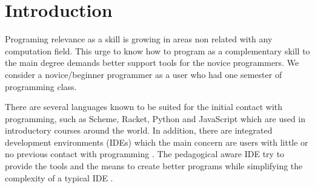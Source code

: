\section{Introduction}




Programing relevance as a skill is growing in areas non related with any computation field.  %
This urge to know how to program as a complementary skill %
to the main degree demands better support tools for the novice programmers. %
We consider a novice/beginner programmer as a user who had one semester of programming class. %


There are several languages known to be suited for the initial contact %
with programming, such as Scheme, Racket, Python and JavaScript which are used in introductory
courses around the world.
In addition, there are integrated development environments (IDEs) which the main
concern are users with little or no previous contact with programming \cite{kolling2003bluej}. %
The pedagogical %
aware IDE try to provide the tools and the means to create better programs while simplifying
the complexity of a typical IDE \cite{pears2007survey}.%

